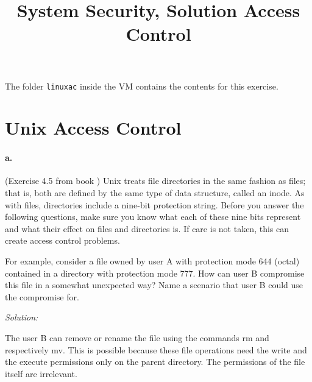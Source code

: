 \documentclass[a4paper,11pt]{article}
\title{System Security,
\ifsolution Solution \else \fi
Access Control}
\newenvironment{solution}%
{\par{\noindent\small\textit{Solution:}}\vspace{-12pt}\begin{framed}}%
{\end{framed}\par}
\begin{document}
\maketitle

\ifsolution \else
The folder \texttt{linuxac} inside the VM contains the contents for this exercise. 
\fi

\section{Unix Access Control}
\paragraph{a.} (Exercise 4.5 from book \cite{book}) Unix treats file directories
in the same fashion as files; that is, both are defined by the same type of data
structure, called an inode. As with files, directories include a nine-bit
protection string.  Before you answer the following questions, make sure you
know what each of these nine bits represent and what their effect on files and
directories is.  If care is not taken, this can create access control problems.

For example, consider a file owned by user A with protection mode 644 (octal)
contained in a directory with protection mode 777. How can user B compromise
this file in a somewhat unexpected way? Name a scenario that user B could use
the compromise for.


\ifsolution\begin{solution}
The user B can remove or rename the file using the commands rm and respectively mv. This is possible because these file operations need the write and the execute permissions only on the parent directory. The permissions of the file itself are irrelevant. 
\end{solution}\fi
\end{document}

